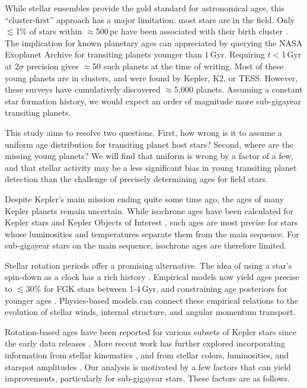 \documentclass[11pt,twocolumn,tighten]{aastex63}
\begin{document}
While stellar ensembles provide the gold standard for astronomical ages,
this ``cluster-first'' approach has a major limitation: most 
stars are in the field.  Only $\lesssim$1\% of stars within
$\approx$500\,pc have been associated with their birth cluster
\citep[e.g.][]{Zari_2018,CantatGaudin_2020,Kounkel_2020,Kerr_2021}.
The implication for known planetary ages can appreciated by querying the NASA Exoplanet Archive
\citep[NEA;][]{2013PASP..125..989A} for transiting planets younger
than 1\,Gyr.  Requiring $t$$<$1\,Gyr at 2$\sigma$ precision gives
$\approx$50 such planets at the time of writing.  Most of these young
planets are in clusters, and were found by Kepler, K2, or TESS.
However, these surveys have cumulatively discovered $\approx$5{,}000 planets.
Assuming a constant star formation history, we would expect an
order of magnitude more sub-gigayear transiting planets.

This study aims to resolve two questions.  First, how wrong is it to
assume a uniform age distribution for transiting planet host stars?
Second, where are the missing young planets?  We will find that
uniform is wrong by a factor of a few, and that stellar activity may
be a less significant bias in young transiting planet detection than
the challenge of precisely determining ages for field stars.

Despite Kepler's main mission ending quite some time ago, the ages of
many Kepler planets remain uncertain.  While isochrone ages have been
calculated for Kepler stars \citep{Berger_2020b_rpage} and Kepler
Objects of Interest \citep[KOIs;][]{Petigura_2022}, such ages are most
precise for stars whose luminosities and temperatures separate them
from the main sequence.  For sub-gigayear stars on the main sequence,
isochrone ages are therefore limited.

Stellar rotation periods offer a promising alternative.  The idea of
using a star's spin-down as a clock has a rich history
\citep{Skumanich_1972,Noyes_1984,Kawaler_1989,Barnes03,Mamajek_2008,Angus_2015,2023ApJ...954L..50E}.
Empirical models now yield ages precise to $\lesssim$30\% for FGK
stars between 1-4\,Gyr, and constraining age posteriors for younger
ages \citep{Bouma_2023}.  Physics-based models
\citep{Matt_2015,Gallet_Bouvier_2015,Spada_2020} can connect these
empirical relations to the evolution of stellar winds, internal
structure, and angular momentum transport.

Rotation-based ages have been reported for various subsets of Kepler
stars since the early data releases
\citep[e.g.][]{Walkowicz_2013,McQuillan_2014,Reinhold_2015,Angus_2018}.
More recent work has further explored incorporating information from
stellar kinematics \citep{2021AJ....161..189L,2024AJ....167..159L},
and from stellar colors, luminosities, and starspot amplitudes
\citep{2023ApJ...952..131M}.  Our analysis is motivated by a few
factors that can yield improvements, particularly for sub-gigayear
stars.   These factors are as follows.
\end{document}
